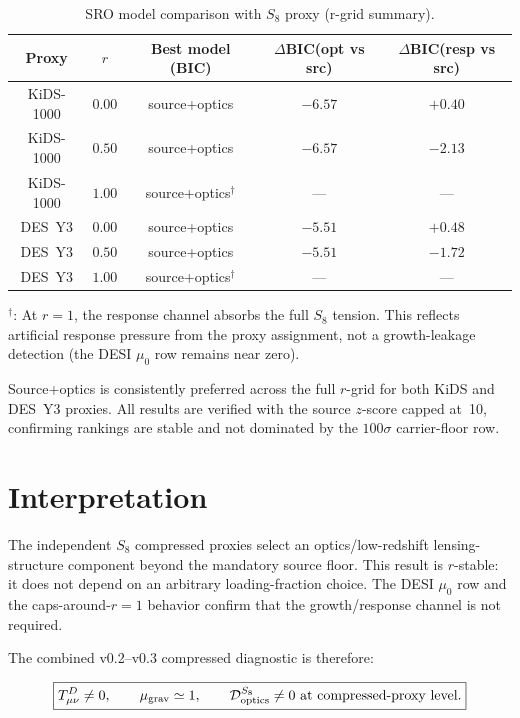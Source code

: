 \documentclass[11pt]{article}
\begin{document}
\begin{table}[h]
\centering
\caption{SRO model comparison with $S_8$ proxy (r-grid summary).}\label{tab:s8results}
\begin{tabular}{ccccc}
\toprule
Proxy & $r$ & Best model (BIC) & $\Delta$BIC(opt vs src) & $\Delta$BIC(resp vs src) \\
\midrule
KiDS-1000 & $0.00$ & source+optics & $-6.57$ & $+0.40$ \\
KiDS-1000 & $0.50$ & source+optics & $-6.57$ & $-2.13$ \\
KiDS-1000 & $1.00$ & source+optics$^\dagger$ & --- & --- \\
DES~Y3 & $0.00$ & source+optics & $-5.51$ & $+0.48$ \\
DES~Y3 & $0.50$ & source+optics & $-5.51$ & $-1.72$ \\
DES~Y3 & $1.00$ & source+optics$^\dagger$ & --- & --- \\
\bottomrule
\end{tabular}
\end{table}

\noindent$^\dagger$: At $r=1$, the response channel absorbs the full $S_8$
tension.  This reflects artificial response pressure from the proxy assignment,
not a growth-leakage detection (the DESI $\mu_0$ row remains near zero).

Source+optics is consistently preferred across the full $r$-grid for both KiDS
and DES~Y3 proxies.  All results are verified with the source $z$-score capped
at~10, confirming rankings are stable and not dominated by the $100\sigma$
carrier-floor row.

\section{Interpretation}

The independent $S_8$ compressed proxies select an optics/low-redshift
lensing-structure component beyond the mandatory source floor.  This result is
$r$-stable: it does not depend on an arbitrary loading-fraction choice.
The DESI $\mu_0$ row and the caps-around-$r=1$ behavior confirm that the
growth/response channel is not required.

The combined v0.2--v0.3 compressed diagnostic is therefore:

\begin{equation}
\boxed{
T_{\mu\nu}^{D}\neq0,\qquad
\mu_{\rm grav}\simeq1,\qquad
\mathcal D_{\rm optics}^{S_8}\neq0
\ \text{at compressed-proxy level}.
}
\end{equation}
\end{document}
